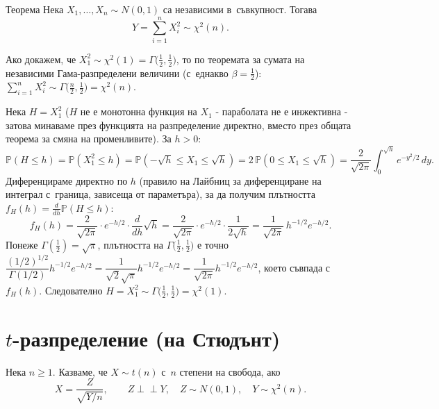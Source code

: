 \begin{thmbox}[]{Теорема}
Нека $X_1,\dots,X_n\sim N(0,1)$ са независими в~съвкупност. Тогава
\[
  Y = \sum_{i=1}^{n} X_i^2 \sim \chi^2(n).
\]
\end{thmbox}

\begin{proofbox}
Ако докажем, че $X_1^2\sim\chi^2(1)=\Gamma\big(\tfrac12,\tfrac12\big)$,
то по теоремата за сумата на независими Гама-разпределени величини
(с~еднакво $\beta=\tfrac12$): $\sum_{i=1}^n X_i^2 \sim
\Gamma\big(\tfrac n2,\tfrac12\big)=\chi^2(n)$.

Нека $H=X_1^2$ ($H$ не е монотонна функция на $X_1$ - параболата не
е инжективна - затова минаваме през функцията на разпределение
директно, вместо през общата теорема за смяна на променливите). За
$h>0$:
\[
  \mathbb P(H\le h) = \mathbb P(X_1^2\le h) = \mathbb P(-\sqrt h\le X_1\le\sqrt h) = 2\,\mathbb P(0\le X_1\le\sqrt h) = \frac2{\sqrt{2\pi}}\int_0^{\sqrt h} e^{-y^2/2}\,dy.
\]
Диференцираме директно по $h$ (правило на Лайбниц за диференциране
на интеграл с~граница, зависеща от параметъра), за да получим
плътността $f_H(h)=\tfrac{d}{dh}\mathbb P(H\le h)$:
\[
  f_H(h) = \frac2{\sqrt{2\pi}}\cdot e^{-h/2}\cdot\frac{d}{dh}\sqrt h = \frac2{\sqrt{2\pi}}\cdot e^{-h/2}\cdot\frac1{2\sqrt h} = \frac1{\sqrt{2\pi}}\,h^{-1/2}e^{-h/2}.
\]
Понеже $\Gamma(\tfrac12)=\sqrt\pi$, плътността на $\Gamma\big(\tfrac12,
\tfrac12\big)$ е точно $\dfrac{(1/2)^{1/2}}{\Gamma(1/2)}h^{-1/2}e^{-h/2}
= \dfrac1{\sqrt2\sqrt\pi}h^{-1/2}e^{-h/2} = \dfrac1{\sqrt{2\pi}}
h^{-1/2}e^{-h/2}$, което съвпада с~$f_H(h)$. Следователно
$H=X_1^2\sim\Gamma\big(\tfrac12,\tfrac12\big)=\chi^2(1)$. \qedbg
\end{proofbox}

\section{\texorpdfstring{$t$}{t}-разпределение (на Стюдънт)}

\begin{defbox}
Нека $n\ge1$. Казваме, че $X\sim t(n)$ с~$n$ степени на свобода, ако
\[
  X = \frac{Z}{\sqrt{Y/n}}, \qquad Z\perp\!\!\!\perp Y,\quad Z\sim N(0,1),\quad Y\sim\chi^2(n).
\]
\end{defbox}
